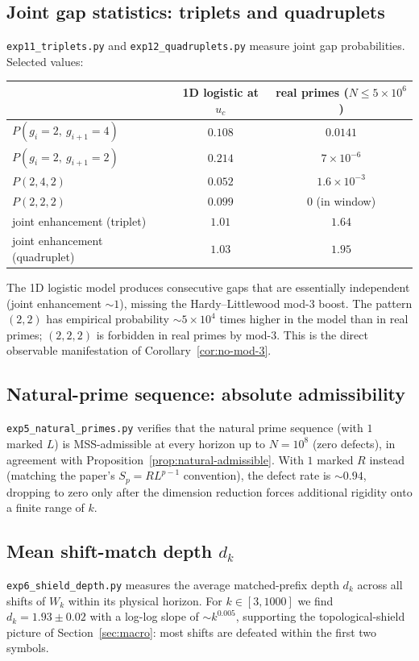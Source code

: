 \subsection{Joint gap statistics: triplets and quadruplets}
\label{app:exp-joint}

\texttt{exp11\_triplets.py} and \texttt{exp12\_quadruplets.py} measure
joint gap probabilities. Selected values:
\begin{center}
\begin{tabular}{l|cc}
& 1D logistic at $u_c$ & real primes ($N \leq 5 \times 10^6$) \\
\hline
$P(g_i = 2,\ g_{i+1} = 4)$ & $0.108$ & $0.0141$ \\
$P(g_i = 2,\ g_{i+1} = 2)$ & $0.214$ & $7 \times 10^{-6}$ \\
$P(2,4,2)$ & $0.052$ & $1.6 \times 10^{-3}$ \\
$P(2,2,2)$ & $0.099$ & $0$ (in window) \\
joint enhancement (triplet) & $1.01$ & $1.64$ \\
joint enhancement (quadruplet) & $1.03$ & $1.95$ \\
\end{tabular}
\end{center}
The 1D logistic model produces consecutive gaps that are essentially
independent (joint enhancement $\sim 1$), missing the
Hardy--Littlewood mod-$3$ boost. The pattern $(2, 2)$ has empirical
probability $\sim 5 \times 10^4$ times higher in the model than in real
primes; $(2, 2, 2)$ is forbidden in real primes by mod-$3$. This is
the direct observable manifestation of Corollary~\ref{cor:no-mod-3}.

\subsection{Natural-prime sequence: absolute admissibility}
\label{app:exp-natural}

\texttt{exp5\_natural\_primes.py} verifies that the natural prime
sequence (with $1$ marked $L$) is MSS-admissible at every horizon up to
$N = 10^8$ (zero defects), in agreement with
Proposition~\ref{prop:natural-admissible}. With $1$ marked $R$ instead
(matching the paper's $S_p = R L^{p-1}$ convention), the defect rate
is $\sim 0.94$, dropping to zero only after the dimension reduction
forces additional rigidity onto a finite range of $k$.

\subsection{Mean shift-match depth $d_k$}
\label{app:exp-shield}

\texttt{exp6\_shield\_depth.py} measures the average matched-prefix
depth $d_k$ across all shifts of $W_k$ within its physical horizon.
For $k \in [3, 1000]$ we find $d_k = 1.93 \pm 0.02$ with a log-log
slope of $\sim k^{0.005}$, supporting the topological-shield picture
of Section~\ref{sec:macro}: most shifts are defeated within the first
two symbols.

